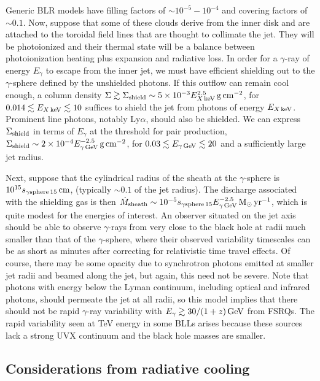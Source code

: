 \documentclass[twocolumn]{aastex62}
\newcommand{\gray}{$\gamma$-ray\xspace}
\begin{document}
Generic BLR models have filling factors of $\sim10^{-5}-10^{-4}$ and covering factors of $\sim0.1$. Now, suppose that some of these clouds derive from the inner disk and are attached to the toroidal field lines that are thought to collimate the jet. They will be
photoionized
and their thermal state will be a balance between photoionization heating plus expansion and radiative loss.
In order for a \gray of energy $E_\gamma$ to escape from the inner jet, we must have efficient shielding out to the $\gamma$-sphere  \citep{1995ApJ...441...79B} defined by the unshielded photons. If this outflow can remain cool enough, a column density $\Sigma\gtrsim\Sigma_{\rm shield}\sim5\times10^{-3}E_{X\,\rm keV}^{2.5}\,{\rm g\,cm}^{-2}$, for $0.014\lesssim E_{X\,\rm keV}\lesssim10$ suffices to shield the jet from photons of energy $E_{X\,\rm keV}$. Prominent line photons, notably Ly$\alpha$, should also be shielded. We can express $\Sigma_{\rm shield}$ in terms of $E_\gamma$ at the threshold for pair production, $\Sigma_{\rm shield}\sim2\times10^{-4}E_{\gamma\,\rm GeV}^{-2.5}\,{\rm g\,cm}^{-2}$, for $0.03\lesssim E_{\gamma\,{\rm GeV}}\lesssim20$ and a sufficiently large jet radius. 

Next, suppose that the cylindrical radius of the sheath at the $\gamma$-sphere is $10^{15}s_{\gamma{\rm sphere}\,15}\,{\rm cm}$, (typically $\sim0.1$ of the jet radius). The discharge associated with the shielding gas is then $\dot M_{\rm sheath}\sim10^{-5}s_{\gamma{\rm sphere}\,15}E_{\gamma\,\rm GeV}^{-2.5}\,{\rm M}_\odot\,{\rm yr}^{-1}$, which is quite modest for the energies of interest. An observer situated on the jet axis should be able to observe $\gamma$-rays from very close to the black hole at radii much smaller than that of the $\gamma$-sphere, where their observed variability timescales can be as short as minutes after correcting for relativistic time travel effects. Of course, there may be some opacity due to synchrotron photons emitted at smaller jet radii and beamed along the jet, but again, this need not be severe. Note that photons with energy below the Lyman continuum, including optical and infrared photons, should permeate the jet at all radii, so this model implies that there should not be rapid \gray variability with $E_{\gamma}\gtrsim30/(1+z)\,{\rm GeV}$ from FSRQs. The rapid variability seen  at TeV energy in some BLLs arises because
these sources lack a strong UVX continuum and the black hole masses are smaller.

\subsection{Considerations from radiative cooling}
\label{sec:tcool}
\end{document}
